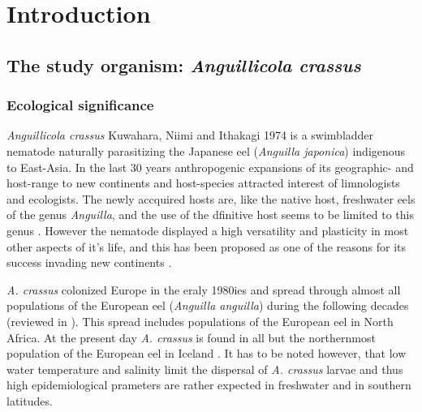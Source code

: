 

\chapter{Introduction}
\label{chap:intro}
\ifpdf
    \graphicspath{{1_introduction/figures/PNG/}{1_introduction/figures/PDF/}{1_introduction/figures/}}
\else
    \graphicspath{{1_introduction/figures/EPS/}{1_introduction/figures/}}
\fi


\section{The study organism: \textit{Anguillicola crassus}} 
\label{stud-org}

\subsection{Ecological significance} 
\label{eco-sig}

\textit{Anguillicola crassus} Kuwahara, Niimi and Ithakagi 1974
\cite{kuwahara_Niimi_Itagaki_1974, moravec_anguillicoloides} is a
swimbladder nematode naturally parasitizing the Japanese eel
(\textit{Anguilla japonica}) indigenous to East-Asia. In the last 30
years anthropogenic expansions of its geographic- and host-range to
new continents and host-species attracted interest of limnologists and
ecologists. The newly accquired hosts are, like the native host,
freshwater eels of the genus \textit{Anguilla}, and the use of the
dfinitive host seems to be limited to this genus
\cite{sures_development_1999}. However the nematode displayed a high
versatility and plasticity in most other aspects of it's life, and
this has been proposed as one of the reasons for its success invading
new continents \cite{taraschewski_hosts_2007}.

\textit{A. crassus} colonized Europe in the eraly 1980ies and spread
through almost all populations of the European eel (\textit{Anguilla
  anguilla}) during the following decades (reviewed in
\cite{kirk_impact_2003}). This spread includes populations of the
European eel in North
Africa\cite{gargouri_ben_abdallah_spatio-temporal_2006,
  loukili_dynamics_2007}. At the present day \textit{A. crassus} is
found in all but the northernmost population of the European eel in
Iceland \cite{kristmundsson_parasite_2007}. It has to be noted
however, that low water temperature \cite{knopf_impact_1998} and
salinity \cite{kirk_effect_2000} limit the dispersal of
\textit{A. crassus} larvae and thus high epidemiological prameters are
rather expected in freshwater and in southern latitudes.

